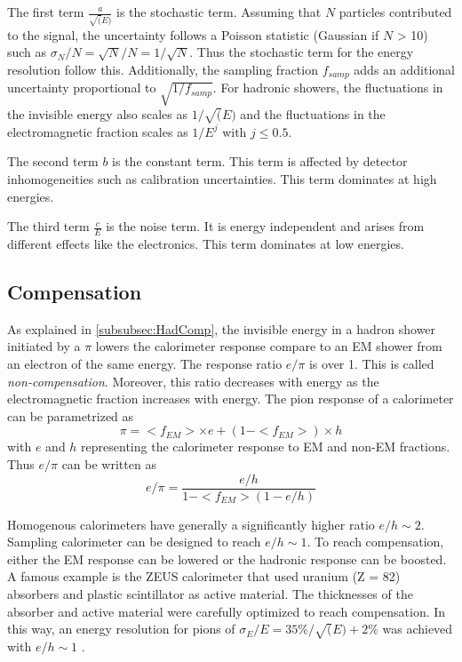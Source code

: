 The first term $\frac{a}{\sqrt(E)}$ is the stochastic term. Assuming that $N$ particles contributed to the signal, the uncertainty follows a Poisson statistic (Gaussian if $N$ > 10) such as $\sigma_N/N = \sqrt{N}/N = 1/\sqrt{N}$. Thus the stochastic term for the energy resolution follow this. Additionally, the sampling fraction $f_{samp}$ adds an additional uncertainty proportional to $\sqrt{1/f_{samp}}$. For hadronic showers, the fluctuations in the invisible energy also scales as $1/\sqrt(E)$ and the fluctuations in the electromagnetic fraction scales as $1/E^j$ with $j \leq 0.5$.

The second term $b$ is the constant term. This term is affected by detector inhomogeneities such as calibration uncertainties. This term dominates at high energies.

The third term $\frac{c}{E}$ is the noise term. It is energy independent and arises from different effects like the electronics. This term dominates at low energies.

\subsection{Compensation}
\label{subsec:Compensation}

As explained in \ref{subsubsec:HadComp}, the invisible energy in a hadron shower initiated by a $\pi$ lowers the calorimeter response compare to an EM shower from an electron of the same energy. The response ratio $e/\pi$ is over 1. This is called \textit{non-compensation}. Moreover, this ratio decreases with energy as the electromagnetic fraction increases with energy. The pion response of a calorimeter can be parametrized as
\begin{equation}
  \pi = <f_{EM}> \times e + (1 - <f_{EM}>) \times h
\end{equation}
with $e$ and $h$ representing the calorimeter response to EM and non-EM fractions. Thus $e/\pi$ can be written as
\begin{equation}
  e/\pi = \frac{e/h}{1 - <f_{EM}>\left(1 - e/h\right)}
\end{equation}

Homogenous calorimeters have generally a significantly higher ratio $e/h \sim 2$. Sampling calorimeter can be designed to reach $e/h \sim 1$. To reach compensation, either the EM response can be lowered or the hadronic response can be boosted. A famous example is the ZEUS calorimeter that used uranium (Z = 82) absorbers and plastic scintillator as active material. The thicknesses of the absorber and active material were carefully optimized to reach compensation. In this way, an energy resolution for pions of $\sigma_E/E = 35\%/\sqrt(E) + 2\%$ was achieved with $e/h \sim 1$ \cite{BERNSTEIN199323}.

